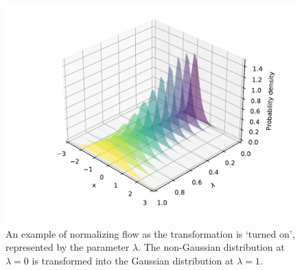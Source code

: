 \begin{figure}[ht]
	\centering
	\includegraphics[width=\textwidth]{plots/flow_3d.pdf}
	\caption{An example of normalizing flow as the transformation is `turned on', represented by the parameter $\lambda$. The non-Gaussian distribution at $\lambda=0$ is transformed into the Gaussian distribution at $\lambda=1$.}
	\label{fig:NF}
\end{figure}